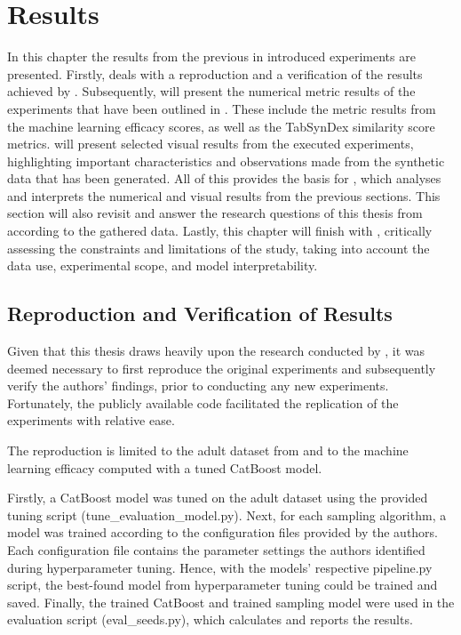 \chapter{Results}
\label{ch:results}

In this chapter the results from the previous in  introduced experiments are presented.
Firstly,  deals with a reproduction and a verification of the results achieved by \textcite{kotelnikov2022TabDDPMModellingTabular}.
Subsequently,  will present the numerical metric results of the experiments that have been outlined in .
These include the metric results from the machine learning efficacy scores, as well as the TabSynDex similarity score metrics.
 will present selected visual results from the executed experiments, highlighting important characteristics and observations made from the synthetic data that has been generated.
All of this provides the basis for , which analyses and interprets the numerical and visual results from the previous sections.
This section will also revisit and answer the research questions of this thesis from  according to the gathered data.
Lastly, this chapter will finish with , critically assessing the constraints and limitations of the study, taking into account the data use, experimental scope, and model interpretability.

\section{Reproduction and Verification of Results}
\label{ch:results-reproduction}

Given that this thesis draws heavily upon the research conducted by \cite{kotelnikov2022TabDDPMModellingTabular},
it was deemed necessary to first reproduce the original experiments and subsequently verify the authors' findings,
prior to conducting any new experiments.
Fortunately, the publicly available code \cite{akim2023TabDDPMModellingTabular} facilitated the replication of the experiments with relative ease.

The reproduction is limited to the adult dataset from  and to the machine learning efficacy computed with a tuned CatBoost \cite{prokhorenkova2018CatBoostUnbiasedBoosting} model.

Firstly, a CatBoost model was tuned on the adult dataset using the provided tuning script (tune\_evaluation\_model.py).
Next, for each sampling algorithm, a model was trained according to the configuration files provided by the authors.
Each configuration file contains the parameter settings the authors identified during hyperparameter tuning.
Hence, with the models' respective pipeline.py script, the best-found model from hyperparameter tuning could be trained and saved.
Finally, the trained CatBoost and trained sampling model were used in the evaluation script (eval\_seeds.py), which calculates and reports the results.

